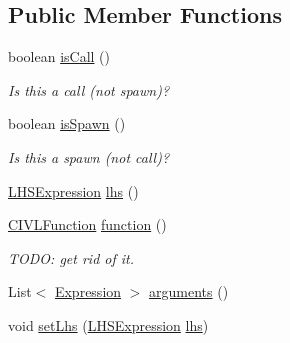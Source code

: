 \subsection*{Public Member Functions}
\begin{DoxyCompactItemize}
\item 
boolean \hyperlink{interfaceedu_1_1udel_1_1cis_1_1vsl_1_1civl_1_1model_1_1IF_1_1statement_1_1CallOrSpawnStatement_a77b65241d9713311e60dcd6fbdac6117}{is\+Call} ()
\begin{DoxyCompactList}\small\item\em Is this a call (not spawn)? \end{DoxyCompactList}\item 
boolean \hyperlink{interfaceedu_1_1udel_1_1cis_1_1vsl_1_1civl_1_1model_1_1IF_1_1statement_1_1CallOrSpawnStatement_a514d4fca6d2ae3fa69a11b23d76bd125}{is\+Spawn} ()
\begin{DoxyCompactList}\small\item\em Is this a spawn (not call)? \end{DoxyCompactList}\item 
\hyperlink{interfaceedu_1_1udel_1_1cis_1_1vsl_1_1civl_1_1model_1_1IF_1_1expression_1_1LHSExpression}{L\+H\+S\+Expression} \hyperlink{interfaceedu_1_1udel_1_1cis_1_1vsl_1_1civl_1_1model_1_1IF_1_1statement_1_1CallOrSpawnStatement_a2ac023b3d49c44fdc245ef941fad6456}{lhs} ()
\item 
\hyperlink{interfaceedu_1_1udel_1_1cis_1_1vsl_1_1civl_1_1model_1_1IF_1_1CIVLFunction}{C\+I\+V\+L\+Function} \hyperlink{interfaceedu_1_1udel_1_1cis_1_1vsl_1_1civl_1_1model_1_1IF_1_1statement_1_1CallOrSpawnStatement_ae7f9af5b547634bb2894e21875ab22a2}{function} ()
\begin{DoxyCompactList}\small\item\em T\+O\+D\+O\+: get rid of it. \end{DoxyCompactList}\item 
List$<$ \hyperlink{interfaceedu_1_1udel_1_1cis_1_1vsl_1_1civl_1_1model_1_1IF_1_1expression_1_1Expression}{Expression} $>$ \hyperlink{interfaceedu_1_1udel_1_1cis_1_1vsl_1_1civl_1_1model_1_1IF_1_1statement_1_1CallOrSpawnStatement_acd526acdc6b8651aa60ddcf1db40a92c}{arguments} ()
\item 
void \hyperlink{interfaceedu_1_1udel_1_1cis_1_1vsl_1_1civl_1_1model_1_1IF_1_1statement_1_1CallOrSpawnStatement_a6a76c27700c82aa54d4e86756328eb3c}{set\+Lhs} (\hyperlink{interfaceedu_1_1udel_1_1cis_1_1vsl_1_1civl_1_1model_1_1IF_1_1expression_1_1LHSExpression}{L\+H\+S\+Expression} \hyperlink{interfaceedu_1_1udel_1_1cis_1_1vsl_1_1civl_1_1model_1_1IF_1_1statement_1_1CallOrSpawnStatement_a2ac023b3d49c44fdc245ef941fad6456}{lhs})

\end{DoxyCompactItemize}
